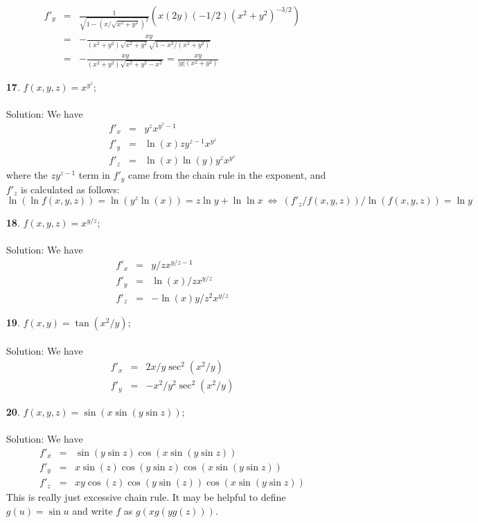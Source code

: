 \documentclass[12pt]{amsbook}
\begin{document}
\begin{enumerate}
\begin{eqnarray*}
f'_y&=& \frac{1}{\sqrt{1-(x/\sqrt{x^2+y^2})^2}}(x(2y)(-1/2)(x^2+y^2)^{-3/2}) \\
&=&-\frac{xy}{(x^2+y^2)\sqrt{x^2+y^2}\sqrt{1-x^2/(x^2+y^2)}} \\
&=&-\frac{xy}{(x^2+y^2)\sqrt{x^2+y^2-x^2}}= \frac{xy}{|y|(x^2+y^2)}
\end{eqnarray*}
\item[{\small\bf 17}.] $f(x,y,z)=x^{y^z}$;
\\
\\
{\sc Solution}: We have
\begin{eqnarray*}
f'_x&=& y^zx^{y^z-1} \\
f'_y&=& \ln (x)zy^{z-1}x^{y^z} \\
f'_z&=& \ln(x)\ln(y)y^zx^{y^z}
\end{eqnarray*}
where the $zy^{z-1}$ term in $f'_y$ came from the chain rule in the exponent, and $f'_z$ is calculated as follows:
$$\ln(\ln f(x,y,z))=\ln(y^z\ln(x))=z\ln y+\ln\ln x \ \Leftrightarrow \ (f'_z/f(x,y,z))/\ln(f(x,y,z))=\ln y$$
\item[{\small\bf 18}.] $f(x,y,z)=x^{y/z}$;
\\
\\
{\sc Solution}: We have
\begin{eqnarray*}
f'_x&=& y/zx^{y/z-1} \\
f'_y&=& \ln (x)/zx^{y/z} \\
f'_z&=& -\ln(x)y/z^2x^{y/z}
\end{eqnarray*}
\item[{\small\bf 19}.] $f(x,y)=\tan(x^2/y)$;
\\
\\
{\sc Solution}: We have
\begin{eqnarray*}
f'_x&=& 2x/y\sec^2(x^2/y) \\
f'_y&=& -x^2/y^2\sec^2(x^2/y)
\end{eqnarray*}
\item[{\small\bf 20}.] $f(x,y,z)=\sin(x\sin(y\sin z))$;
\\
\\
{\sc Solution}: We have
\begin{eqnarray*}
f'_x&=& \sin(y\sin z)\cos(x\sin(y\sin z)) \\
f'_y&=& x\sin (z)\cos(y\sin z)\cos(x\sin(y\sin z)) \\
f'_z&=& xy\cos(z)\cos(y\sin(z))\cos(x\sin(y\sin z)) 
\end{eqnarray*}
This is really just excessive chain rule. It may be helpful to define $g(u)=\sin u$ and write $f$ as $g(xg(yg(z)))$. 
\\

\end{enumerate}
\end{document}
